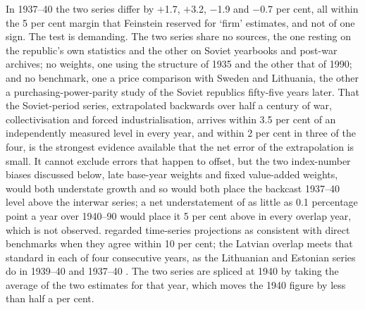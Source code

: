 

In 1937--40 the two series differ by $+$1.7, $+$3.2, $-$1.9 and $-$0.7 per cent, all within the 5 per cent margin that Feinstein reserved for `firm' estimates, and not of one sign. The test is demanding. The two series share no sources, the one resting on the republic's own statistics and the other on Soviet yearbooks and post-war archives; no weights, one using the structure of 1935 and the other that of 1990; and no benchmark, one a price comparison with Sweden and Lithuania, the other a purchasing-power-parity study of the Soviet republics fifty-five years later. That the Soviet-period series, extrapolated backwards over half a century of war, collectivisation and forced industrialisation, arrives within 3.5 per cent of an independently measured level in every year, and within 2 per cent in three of the four, is the strongest evidence available that the net error of the extrapolation is small. It cannot exclude errors that happen to offset, but the two index-number biases discussed below, late base-year weights and fixed value-added weights, would both understate growth and so would both place the backcast 1937--40 level above the interwar series; a net understatement of as little as 0.1 percentage point a year over 1940--90 would place it 5 per cent above in every overlap year, which is not observed. \textcite[323--6]{broad2007} regarded time-series projections as consistent with direct benchmarks when they agree within 10 per cent; the Latvian overlap meets that standard in each of four consecutive years, as the Lithuanian and Estonian series do in 1939--40 and 1937--40 \parencite{klimantas2026soviet,klimantas2025estonia}. The two series are spliced at 1940 by taking the average of the two estimates for that year, which moves the 1940 figure by less than half a per cent.

